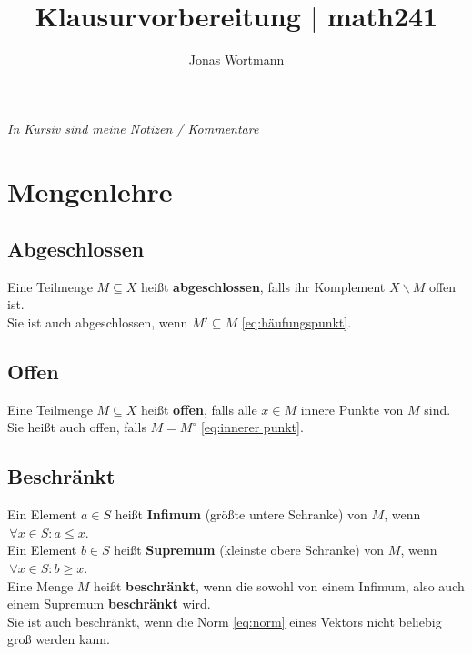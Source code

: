 \documentclass[a4paper,12pt]{article}
\numberwithin{equation}{section}
\begin{document}

\title{Klausurvorbereitung $|$ math241}
\author{Jonas Wortmann}
\maketitle
\vfill
\textit{In Kursiv sind meine Notizen / Kommentare}


\newpage


\fancyhead[L]{\thepage}
\fancyfoot[C]{}

\tableofcontents


\newpage


\fancyhead[R]{\leftmark\\\rightmark}

\section{Mengenlehre}
\subsection{Abgeschlossen}
Eine Teilmenge $M\subseteq X$ heißt \textbf{abgeschlossen}, falls ihr Komplement $X\backslash M$ offen ist.\\
Sie ist auch abgeschlossen, wenn $M'\subseteq M$ \eqref{eq:häufungspunkt}.

\subsection{Offen}
Eine Teilmenge $M\subseteq X$ heißt \textbf{offen}, falls alle $x  \in M$ innere Punkte von $M$ sind.\\
Sie heißt auch offen, falls $M=M^\circ $ \eqref{eq:innerer punkt}.

\subsection{Beschränkt}
Ein Element $a \in S$ heißt \textbf{Infimum} (größte untere Schranke) von $M$, wenn $\,\forall x  \in S:a\leq x$.\\
Ein Element $b \in S$ heißt \textbf{Supremum} (kleinste obere Schranke) von $M$, wenn $\,\forall x  \in S:b\geq x$.\\
Eine Menge $M$ heißt \textbf{beschränkt}, wenn die sowohl von einem Infimum, also auch einem Supremum \textbf{beschränkt} wird.\\\indent
Sie ist auch beschränkt, wenn die Norm \eqref{eq:norm} eines Vektors nicht beliebig groß werden kann.
\end{document}
